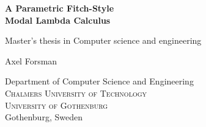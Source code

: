 \documentclass[12pt,twoside,openright]{report}
\numberwithin{equation}{chapter}
\numberwithin{figure}{chapter}
\numberwithin{table}{chapter}
\theoremstyle{definition}\newtheorem{definition}{Definition}
\newcommand{\multiLineTitle}[1]{A Parametric Fitch-Style \\[#1] Modal Lambda Calculus}
\begin{document}

\begin{titlepage}

\mbox{}
\vfill
\renewcommand{\familydefault}{\sfdefault}\normalfont

\textbf{\Huge \multiLineTitle{0.2cm}} \setlength{\parskip}{0.5cm}

Master's thesis in Computer science and engineering \setlength{\parskip}{1cm}

{\Large Axel Forsman} \setlength{\parskip}{2.9cm}

Department of Computer Science and Engineering \\
\textsc{Chalmers University of Technology} \\
\textsc{University of Gothenburg} \\
Gothenburg, Sweden \the\year
\end{titlepage}
\end{document}
